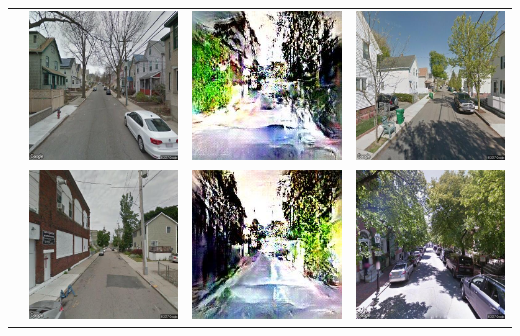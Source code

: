 \begin{table}
\begin{tabular}{l*3{C}@{}}
        & \includegraphics[width=11em]{u_7.jpeg} & \includegraphics[width=11em]{t_7.jpeg} &  \includegraphics[width=11em]{b_7.jpeg} \\ 
        & \includegraphics[width=11em]{u_8.jpeg} & \includegraphics[width=11em]{t_8.jpeg} &  \includegraphics[width=11em]{b_8.jpeg} \\ 

\end{tabular}
\end{table}
